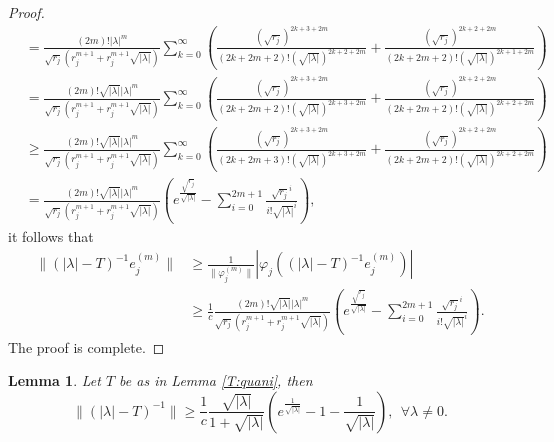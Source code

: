 \documentclass[12pt]{amsart}
\numberwithin{equation}{section}
\theoremstyle{plain}
\newtheorem{lem}[thm]{Lemma}
\theoremstyle{definition}
\begin{document}
\begin{proof}
\begin{align*}
&=\frac{(2m)!|\lambda|^{m}}{\sqrt{r_j}(r_j^{m+1}+r_j^{m+1}\sqrt{|\lambda|})}
\sum\limits_{k=0}^{\infty}\left(\frac{(\sqrt{{r_j}})^{2k+3+2m}}{(2k+2m+2)!(\sqrt{|\lambda|})^{2k+2+2m}}+
\frac{(\sqrt{{r_j}})^{2k+2+2m}}{(2k+2m+2)!(\sqrt{|\lambda|})^{2k+1+2m}}\right)\\
&=\frac{(2m)!\sqrt{|\lambda|}|\lambda|^{m}}{\sqrt{r_j}(r_j^{m+1}+r_j^{m+1}\sqrt{|\lambda|})}
\sum\limits_{k=0}^{\infty}\left(\frac{(\sqrt{{r_j}})^{2k+3+2m}}{(2k+2m+2)!(\sqrt{|\lambda|})^{2k+3+2m}}+
\frac{(\sqrt{{r_j}})^{2k+2+2m}}{(2k+2m+2)!(\sqrt{|\lambda|})^{2k+2+2m}}\right)\\
&\geq\frac{(2m)!\sqrt{|\lambda|}|\lambda|^{m}}{\sqrt{r_j}(r_j^{m+1}+r_j^{m+1}\sqrt{|\lambda|})}
\sum\limits_{k=0}^{\infty}\left(\frac{(\sqrt{{r_j}})^{2k+3+2m}}{(2k+2m+3)!(\sqrt{|\lambda|})^{2k+3+2m}}+
\frac{(\sqrt{{r_j}})^{2k+2+2m}}{(2k+2m+2)!(\sqrt{|\lambda|})^{2k+2+2m}}\right)\\
&=
\frac{(2m)!\sqrt{|\lambda|}|\lambda|^{m}}{\sqrt{r_j}(r_j^{m+1}+r_j^{m+1}\sqrt{|\lambda|})}
\left(e^{\frac{\sqrt{r_j}}{\sqrt{|\lambda|}}}-\sum_{i=0}^{2m+1}\frac{\sqrt{r_j}^i}{i!\sqrt{|\lambda|}^{i}}\right),
\end{align*}
it follows that
\begin{align*}
\|(|\lambda|-T)^{-1}e_j^{(m)}\|
&\geq
\frac{1}{\|\varphi_j^{(m)}\|}\left|\varphi_j\left((|\lambda|-T)^{-1}e_j^{(m)}\right)\right|\\
&\geq
\frac{1}{c}\frac{(2m)!\sqrt{|\lambda|}|\lambda|^{m}}{\sqrt{r_j}(r_j^{m+1}+r_j^{m+1}\sqrt{|\lambda|})}
\left(e^{\frac{\sqrt{r_j}}{\sqrt{|\lambda|}}}-\sum_{i=0}^{2m+1}\frac{\sqrt{r_j}^i}{i!\sqrt{|\lambda|}^{i}}\right).
\end{align*}
The proof is complete.
\end{proof}


\begin{lem}\label{T:normal}
Let $T$ be as in Lemma \ref{T:quani},
then
\begin{equation}\label{T:leqnorm}
\|(|\lambda|-T)^{-1}\|\geq \frac{1}{c}\frac{\sqrt{|\lambda|}}{1+\sqrt{|\lambda|}}
\left(e^{\frac{1}{\sqrt{|\lambda|}}}-1-\frac{1}{\sqrt{|\lambda|}}\right),\ \ \forall\lambda\neq 0.
\end{equation}
\end{lem}
\end{document}
